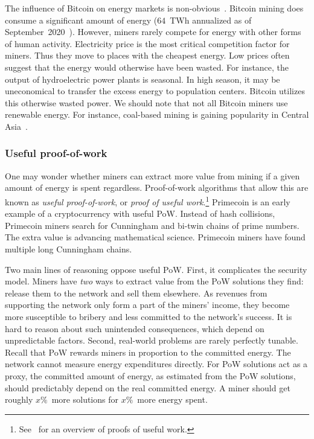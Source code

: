 The influence of Bitcoin on energy markets is non-obvious~\cite{Carter2020}.
Bitcoin mining does consume a significant amount of energy ($64$~TWh annualized as of September~2020~\cite{Rauchs2020}).
However, miners rarely compete for energy with other forms of human activity.
Electricity price is the most critical competition factor for miners.
Thus they move to places with the cheapest energy.
Low prices often suggest that the energy would otherwise have been wasted.
For instance, the output of hydroelectric power plants is seasonal.
In high season, it may be uneconomical to transfer the excess energy to population centers.
Bitcoin utilizes this otherwise wasted power.
We should note that not all Bitcoin miners use renewable energy.
For instance, coal-based mining is gaining popularity in Central Asia~\cite{8BTCStaff2020}.


\subsubsection*{Useful proof-of-work}

One may wonder whether miners can extract more value from mining if a given amount of energy is spent regardless.
Proof-of-work algorithms that allow this are known as \textit{useful proof-of-work}, or \textit{proof of useful work}.\footnote{See~\cite{Ball2017} for an overview of proofs of useful work.}
Primecoin is an early example of a cryptocurrency with useful PoW.
Instead of hash collisions, Primecoin miners search for Cunningham and bi-twin chains of prime numbers.
The extra value is advancing mathematical science.
Primecoin miners have found multiple long Cunningham chains.

Two main lines of reasoning oppose useful PoW.
First, it complicates the security model.
Miners have \textit{two} ways to extract value from the PoW solutions they find: release them to the network and sell them elsewhere.
As revenues from supporting the network only form a part of the miners' income, they become more susceptible to bribery and less committed to the network's success.
It is hard to reason about such unintended consequences, which depend on unpredictable factors.
Second, real-world problems are rarely perfectly tunable.
Recall that PoW rewards miners in proportion to the committed energy.
The network cannot measure energy expenditures directly.
For PoW solutions act as a proxy, the committed amount of energy, as estimated from the PoW solutions, should predictably depend on the real committed energy.
A miner should get roughly $x\%$~more solutions for $x\%$~more energy spent.

